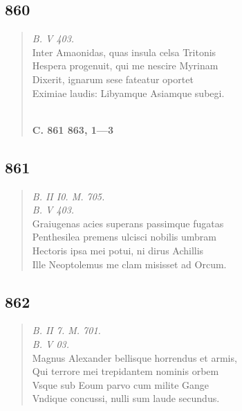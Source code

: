 \documentclass[11pt, a4paper]{report}
\begin{document}
            \subsection*{860}
      \begin{verse}
      \textit{B. V 403.} \\ Inter Amaonidas, quas insula celsa Tritonis \\ Hespera progenuit, qui me nescire Myrinam \\ Dixerit, ignarum sese fateatur oportet \\ Eximiae laudis: Libyamque Asiamque subegi. \\ 
        ﻿\pagebreak 
    \begin{center} \textbf{C. 861 863, 1—3} \end{center} \marginpar{[313]} 
      \end{verse}
  
            \subsection*{861}
      \begin{verse}
      \textit{B. II I0. M. 705.} \\ \textit{B. V 403.} \\ Graiugenas acies superans passimque fugatas \\ Penthesilea premens ulcisci nobilis umbram \\ Hectoris ipsa mei potui, ni dirus Achillis \\ Ille Neoptolemus me clam misisset ad Orcum. \\ 
      \end{verse}
  
            \subsection*{862}
      \begin{verse}
      \textit{B. II 7. M. 701.} \\ \textit{B. V 03.} \\ Magnus Alexander bellisque horrendus et armis, \\ Qui terrore mei trepidantem nominis orbem \\ Vsque sub Eoum parvo cum milite Gange \\ Vndique concussi, nulli sum laude secundus. \\ 
      \end{verse}
  
\end{document}
